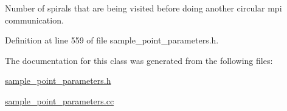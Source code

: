 Number of spirals that are being visited before doing another circular mpi communication. 



Definition at line 559 of file sample\+\_\+point\+\_\+parameters.\+h.



The documentation for this class was generated from the following files\+:\begin{DoxyCompactItemize}
\item 
\hyperlink{sample__point__parameters_8h}{sample\+\_\+point\+\_\+parameters.\+h}\item 
\hyperlink{sample__point__parameters_8cc}{sample\+\_\+point\+\_\+parameters.\+cc}\end{DoxyCompactItemize}
